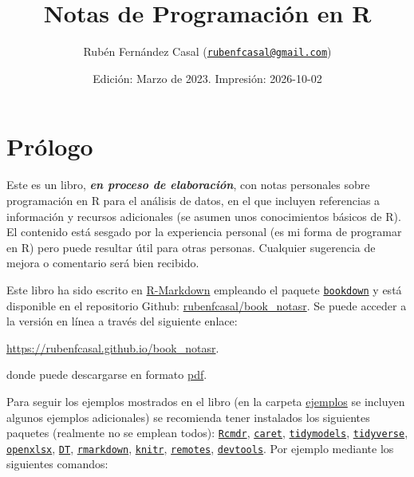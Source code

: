 \documentclass[
]{book}
\title{Notas de Programación en R}
\author{Rubén Fernández Casal (\href{mailto:rubenfcasal@gmail.com}{\nolinkurl{rubenfcasal@gmail.com}})}
\date{Edición: Marzo de 2023. Impresión: 2026-10-02}
\theoremstyle{break}
\theoremstyle{nonumberplain}
\begin{document}
\maketitle

{
\setcounter{tocdepth}{1}
\tableofcontents
}
\chapter*{Prólogo}\label{pruxf3logo}

Este es un libro, \textbf{\emph{en proceso de elaboración}}, con notas personales sobre programación en R para el análisis de datos, en el que incluyen referencias a información y recursos adicionales (se asumen unos conocimientos básicos de R).
El contenido está sesgado por la experiencia personal (es mi forma de programar en R) pero puede resultar útil para otras personas.
Cualquier sugerencia de mejora o comentario será bien recibido.

Este libro ha sido escrito en \href{http://rmarkdown.rstudio.com}{R-Markdown} empleando el paquete \href{https://bookdown.org/yihui/bookdown/}{\texttt{bookdown}} y está disponible en el repositorio Github: \href{https://github.com/rubenfcasal/book_notasr}{rubenfcasal/book\_notasr}.
Se puede acceder a la versión en línea a través del siguiente enlace:

\url{https://rubenfcasal.github.io/book_notasr}.

donde puede descargarse en formato \href{https://rubenfcasal.github.io/book_notasr/Notas_R.pdf}{pdf}.

Para seguir los ejemplos mostrados en el libro (en la carpeta \href{https://github.com/rubenfcasal/book_notasr/tree/main/ejemplos}{ejemplos} se incluyen algunos ejemplos adicionales) se recomienda tener instalados los siguientes paquetes (realmente no se emplean todos):
\href{https://github.com/RCmdr-Project/rcmdr}{\texttt{Rcmdr}}, \href{https://github.com/topepo/caret/}{\texttt{caret}}, \href{https://tidymodels.tidymodels.org}{\texttt{tidymodels}}, \href{https://tidyverse.tidyverse.org}{\texttt{tidyverse}}, \href{https://ycphs.github.io/openxlsx/index.html}{\texttt{openxlsx}}, \href{https://github.com/rstudio/DT}{\texttt{DT}}, \href{https://github.com/rstudio/rmarkdown}{\texttt{rmarkdown}}, \href{https://yihui.org/knitr/}{\texttt{knitr}}, \href{https://remotes.r-lib.org}{\texttt{remotes}}, \href{https://devtools.r-lib.org/}{\texttt{devtools}}.
Por ejemplo mediante los siguientes comandos:
\end{document}
